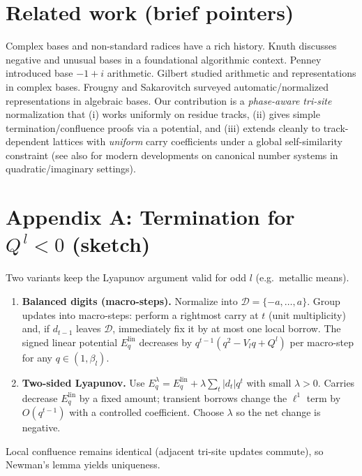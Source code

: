 \documentclass[11pt]{article}
\theoremstyle{definition}
\theoremstyle{remark}
\begin{document}
\section{Related work (brief pointers)}
Complex bases and non-standard radices have a rich history.
Knuth \cite{Knuth1997} discusses negative and unusual bases in a foundational algorithmic context.
Penney \cite{Penney1965} introduced base $-1+i$ arithmetic.
Gilbert \cite{Gilbert1981,Gilbert1983} studied arithmetic and representations in complex bases.
Frougny and Sakarovitch \cite{FrougnySakarovitch1992} surveyed automatic/normalized representations in algebraic bases.
Our contribution is a \emph{phase-aware tri-site} normalization that (i) works uniformly on residue tracks, (ii) gives simple termination/confluence proofs via a potential, and (iii) extends cleanly to track-dependent lattices with \emph{uniform} carry coefficients under a global self-similarity constraint
(see also \cite{Heuberger2007,AkiyamaPetho2011} for modern developments on canonical number systems in quadratic/imaginary settings).

\section*{Appendix A: Termination for $Q^{\,l}<0$ (sketch)}
Two variants keep the Lyapunov argument valid for odd $l$ (e.g.\ metallic means).
\begin{enumerate}
\item \textbf{Balanced digits (macro-steps).}
Normalize into $\mathcal D=\{-a,\dots,a\}$. Group updates into macro-steps:
perform a rightmost carry at $t$ (unit multiplicity) and, if $d_{t-1}$ leaves $\mathcal D$, immediately fix it by at most one local borrow.
The signed linear potential $E_q^{\mathrm{lin}}$ decreases by $q^{t-1}(q^2-V_l q + Q^l)$ per macro-step for any $q\in(1,\beta_l)$.
\item \textbf{Two-sided Lyapunov.}
Use $E_q^\lambda=E_q^{\mathrm{lin}}+\lambda\sum_t |d_t|q^t$ with small $\lambda>0$.
Carries decrease $E_q^{\mathrm{lin}}$ by a fixed amount; transient borrows change the $\ell^1$ term by $O(q^{t-1})$ with a controlled coefficient. Choose $\lambda$ so the net change is negative.
\end{enumerate}
Local confluence remains identical (adjacent tri-site updates commute), so Newman’s lemma yields uniqueness.
\end{document}
